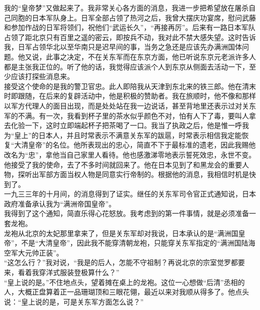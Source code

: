 我的“皇帝梦”又做起来了。我非常关心各方面的消息，我进一步把希望放在屠杀自己同胞的日本军队身上。日军全部占领了热河之后，我曾大摆庆功宴席，慰问武藤和参加作战的日军将领们，祝他们“武运长久”，“再接再厉”。后来有一路日本军队占领了距北京只有百里之遥的密云，即按兵不动，我对此不禁大感失望。这时告诉我，日军占领华北以至华南只是迟早间的事，当务之急还是应该先办满洲国体问题。他又说，此事之决定，不在关东军而在东京方面，他已听说东京元老派许多人都是主张我正位的。听了他的话，我觉得应该派个人到东京从侧面去活动一下，至少应该打探些消息来。\\

接受这个使命的是我的警卫官忠。此人即陪我从天津到东北来的铁三郎。他在清末时即跟随，在后来的复辟活动中，他是积极的赞助者。我在旅顺时，他不像和那样以军方代理人的面目出现，而是处处站在我一边说话，甚至背地里还表示过对关东军的不满。有一次，我看到杯子里的茶水似乎颜色不对，怕有人下了毒，要叫人拿去化验一下，这时立即端起杯子把茶喝了一口。我当了执政之后，他是惟一呼我为“皇上”的日本人，并且时常表示不满意关东军的跋扈，时常表示相信我定能恢复“大清皇帝”的名位。他所表现出的忠心，简直不下于最标准的遗老，因此我赐他改名为“忠”，拿他当自己家里人看待。他也感激涕零地表示誓死效忠，永世不变。他接受了我的使命，去了不多时间就回来了。他在日本见到了和黑龙会的重要人物，探听出军部方面当权人物是同意实行帝制的。根据他的消息，我相信时机是快到了。\\

一九三三年的十月间，的消息得到了证实。继任的关东军司令官正式通知说，日本政府准备承认我为“满洲帝国皇帝”。\\

我得到了这个通知，简直乐得心花怒放。我考虑到的第一件事情，就是必须准备一套龙袍。\\

龙袍从北京的太妃那里拿来了，但是关东军却对我说，日本承认的是“满洲国皇帝”，不是“大清皇帝”，因此我不能穿清朝龙袍，只能穿关东军指定的“满洲国陆海空军大元帅正装”。\\

“这怎么行？”我对说，“我是的后人，怎能不守祖制？再说北京的宗室觉罗都要来，看着我穿洋式服装登极算什么？”\\

“皇上说的是。”不住地点头，望着摊在桌上的龙袍。这位一心想做“后清”丞相的人，大概正盘算着正一品珊瑚顶和三眼花翎，最近以来对我顺从得多了。他点头说：“皇上说的是，可是关东军方面怎么说？”\\


